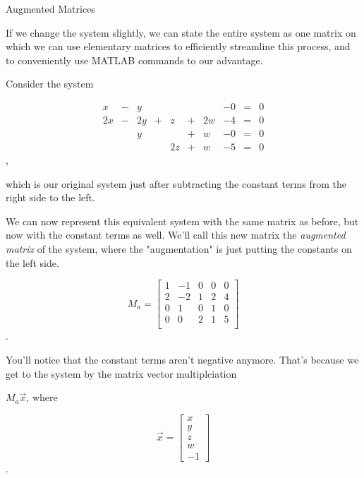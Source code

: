 \documentclass{ximera}
\begin{document}
\begin{remark}{Augmented Matrices}

If we change the system slightly, we can state the entire system as one matrix on which we can use elementary matrices to efficiently streamline this process, and to conveniently use MATLAB commands to our advantage.

Consider the system 

\begin{equation}
  \begin{array}{cccccccccc}
      x &- &y&&&&&-0&= &0 \\
     2x& -&2y&+&z&+&2w&-4&=&0\\
     & &y&&&+&w&-0&=&0\\
     & &&&2z&+&w&-5&=&0
  \end{array}
\end{equation}, 

which is our original system just after subtracting the constant terms from the right side to the left.

We can now represent this equivalent system with the same matrix as before, but now with the constant terms as well. We'll call this new matrix the \emph{augmented matrix} of the system, where the "augmentation" is just putting the constants on the left side.

\begin{equation}
  M_a=\begin{bmatrix}
    1 & -1 & 0 & 0 & 0\\
    2 & -2 & 1 & 2 & 4\\
    0 & 1  & 0 & 1 & 0\\
    0 & 0  & 2 & 1 & 5\\
  \end{bmatrix}
\end{equation}.

You'll notice that the constant terms aren't negative anymore. That's because we get to the system by the matrix vector multiplciation 

$M_a\vec{x}$, where 

\begin{equation}
  \vec{x}=\begin{bmatrix}
    x \\
    y  \\
    z \\
    w \\
    -1  
  \end{bmatrix}
\end{equation}.


\end{remark}
\end{document}
